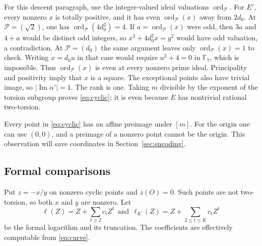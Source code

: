 \documentclass[11pt,reqno]{amsart}
\theoremstyle{definition}
\numberwithin{equation}{section}
\newcommand{\F}{\mathbb F}
\newcommand{\im}{\operatorname{Im}}
\def\t{\text}
\begin{document}
For this descent paragraph, use the integer-valued ideal valuations $\operatorname{ord}_{\mathcal P}$. For $E'$, every nonzero $x$ is totally positive, and it has even $\operatorname{ord}_{\mathcal P}(x)$ away from $2d_0$. At $\mathcal P=(\sqrt2)$, one has $\operatorname{ord}_{\mathcal P}(4d_0^2)=4$. If $a=\operatorname{ord}_{\mathcal P}(x)$ were odd, then $3a$ and $4+a$ would be distinct odd integers, so $x^3+4d_0^2x=y^2$ would have odd valuation, a contradiction. At $\mathcal P=(d_0)$ the same argument leaves only $\operatorname{ord}_{\mathcal P}(x)=1$ to check. Writing $x=d_0u$ in that case would require $u^2+4=0$ in $\F_7$, which is impossible. Thus $\operatorname{ord}_{\mathcal P}(x)$ is even at every nonzero prime ideal. Principality and positivity imply that $x$ is a square. The exceptional points also have trivial image, so $|\im\alpha'|=1$. The rank is one. Taking $m$ divisible by the exponent of the torsion subgroup proves \eqref{eq:cyclic}; it is even because $E$ has nontrivial rational two-torsion.


Every point in \eqref{eq:cyclic} has an affine preimage under $[m]$. For the origin one can use $(0,0)$, and a preimage of a nonzero point cannot be the origin. This observation will save coordinates in Section~\ref{sec:encoding}.

\subsection{Formal comparisons}
Put $z=-x/y$ on nonzero cyclic points and $z(O)=0$. Such points are not two-torsion, so both $x$ and $y$ are nonzero. Let
\[
 \ell(Z)=Z+\sum_{t\ge2}c_tZ^t\ \ \t{and}\ \ 
 \ell_K(Z)=Z+\sum_{2\le t\le K}c_tZ^t
\]
be the formal logarithm and its truncation. The coefficients are effectively computable from \eqref{eq:curve}.
\end{document}

